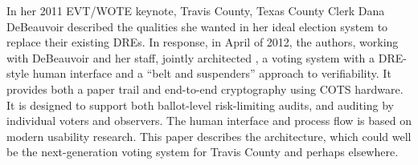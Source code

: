In her 2011 EVT/WOTE keynote, Travis County, Texas County Clerk
Dana DeBeauvoir described the qualities she wanted in her ideal election system
to replace their existing DREs.
In response, in April of 2012, the authors, working with DeBeauvoir and her staff,
jointly architected \projname, a voting system with a DRE-style human interface
and a ``belt and suspenders'' approach to verifiability.
It provides both a paper trail and end-to-end cryptography using COTS hardware.
It is designed to support both ballot-level risk-limiting audits,
and auditing by individual voters and observers.
The human interface and process flow is based on modern usability research.
This paper describes the \projname architecture, which could well be
the next-generation voting system for Travis County and perhaps
elsewhere.
